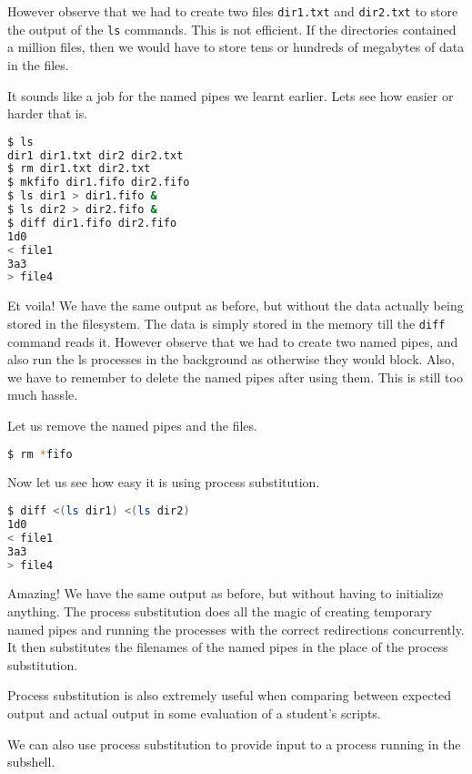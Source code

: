 However observe that we had to create two files \lstinline|dir1.txt|
and \lstinline|dir2.txt| to store the output of the \lstinline|ls|
commands. This is not efficient. If the directories contained
a million files, then we would have to store tens or
hundreds of megabytes of data in the files.

It sounds like a job for the named pipes we learnt earlier.
Lets see how easier or harder that is.

\begin{lstlisting}[language=bash]
$ ls
dir1 dir1.txt dir2 dir2.txt
$ rm dir1.txt dir2.txt
$ mkfifo dir1.fifo dir2.fifo
$ ls dir1 > dir1.fifo &
$ ls dir2 > dir2.fifo &
$ diff dir1.fifo dir2.fifo
1d0
< file1
3a3
> file4
\end{lstlisting}

Et voila! We have the same output as before, but without the
data actually being stored in the filesystem. The data is
simply stored in the memory till the \lstinline|diff| command
reads it. However observe that we had to create two named
pipes, and also run the ls processes in the background as
otherwise they would block.
Also, we have to remember to delete the named pipes after
using them.
This is still too much hassle.

Let us remove the named pipes and the files.
\begin{lstlisting}[language=bash]
$ rm *fifo
\end{lstlisting}

Now let us see how easy it is using process substitution.

\begin{lstlisting}[language=bash]
$ diff <(ls dir1) <(ls dir2)
1d0
< file1
3a3
> file4
\end{lstlisting}

Amazing! We have the same output as before, but without having
to initialize anything. The process substitution does all the
magic of creating temporary named pipes and running the processes
with the correct redirections concurrently. It then substitutes
the filenames of the named pipes in the place of the process
substitution.

Process substitution is also extremely useful when comparing
between expected output and actual output in some evaluation
of a student's scripts.

We can also use process substitution to provide input to a process
running in the subshell.

